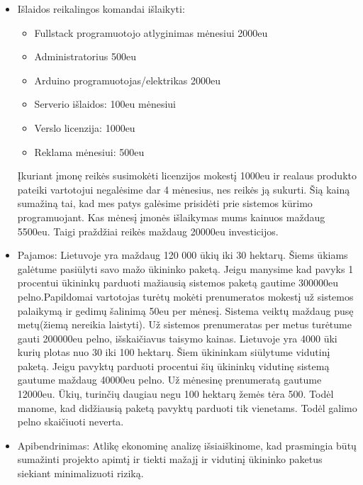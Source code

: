 \documentclass[oneside]{VUMIFPSkursinis}
\begin{document}
\begin{itemize}
\begin{itemize}
		\end{itemize}
		\item{Išlaidos reikalingos komandai išlaikyti:}
		\begin{itemize}
			\item{Fullstack programuotojo atlyginimas mėnesiui 2000eu}
			\item{Administratorius 500eu}
			\item{Arduino programuotojas/elektrikas 2000eu}
			\item{Serverio išlaidos: 100eu mėnesiui}
			\item{Verslo licenzija: 1000eu}
			\item{Reklama mėnesiui: 500eu}
		\end{itemize}
		Įkuriant įmonę reikės susimokėti licenzijos mokestį 1000eu ir realaus produkto pateiki vartotojui negalėsime dar 4 mėnesius, nes reikės ją sukurti. Šią kainą sumažiną tai, kad mes patys galėsime prisidėti prie sistemos kūrimo programuojant. Kas mėnesį įmonės išlaikymas mums kainuos maždaug 5500eu. Taigi praždžiai reikės maždaug 20000eu investicijos. 
		\newline
	

		
		\item{Pajamos:}
Lietuvoje yra maždaug 120 000 ūkių iki 30 hektarų. Šiems ūkiams galėtume pasiūlyti savo mažo ūkininko paketą. Jeigu manysime kad pavyks 1 procentui ūkininkų parduoti mažiausią sistemos paketą gautime 300000eu pelno.Papildomai vartotojas turėtų mokėti prenumeratos mokestį už sistemos palaikymą ir gedimų šalinimą 50eu per mėnesį. Sistema veiktų maždaug pusę metų(žiemą nereikia laistyti). Už sistemos prenumeratas per metus turėtume gauti 200000eu pelno, išskaičiavus taisymo kainas.
		\newline
		Lietuvoje yra 4000 ūki kurių plotas nuo 30 iki 100 hektarų. Šiem ūkininkam siūlytume vidutinį paketą. Jeigu pavyktų parduoti procentui šių ūkininkų vidutinę sistemą gautume maždaug 40000eu pelno. Už mėnesinę prenumeratą gautume 12000eu.
		\newline
		Ūkių, turinčių daugiau negu 100 hektarų žemės tėra 500. Todėl manome, kad didžiausią paketą pavyktų parduoti tik vienetams. Todėl galimo pelno skaičiuoti neverta.
		
		\item{Apibendrinimas:}
		\newline
		Atlikę ekonominę analizę išsiaiškinome, kad prasmingia būtų sumažinti projekto apimtį ir tiekti mažajį ir vidutinį ūkininko paketus siekiant minimalizuoti riziką.


	\end{itemize}
\end{document}
